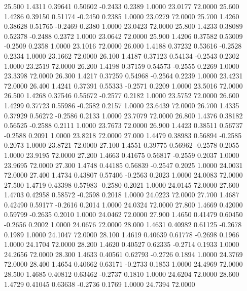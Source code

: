   25.500   1.4311   0.39641   0.50602  -0.2433   0.2389   1.0000  23.0177  72.0000
  25.600   1.4286   0.39150   0.51174  -0.2450   0.2385   1.0000  23.0279  72.0000
  25.700   1.4260   0.38628   0.51765  -0.2469   0.2380   1.0000  23.0423  72.0000
  25.800   1.4233   0.38089   0.52378  -0.2488   0.2372   1.0000  23.0642  72.0000
  25.900   1.4206   0.37582   0.53009  -0.2509   0.2358   1.0000  23.1016  72.0000
  26.000   1.4188   0.37232   0.53616  -0.2528   0.2334   1.0000  23.1662  72.0000
  26.100   1.4187   0.37123   0.54134  -0.2543   0.2302   1.0000  23.2519  72.0000
  26.200   1.4198   0.37159   0.54573  -0.2555   0.2269   1.0000  23.3398  72.0000
  26.300   1.4217   0.37259   0.54968  -0.2564   0.2239   1.0000  23.4231  72.0000
  26.400   1.4241   0.37391   0.55333  -0.2571   0.2209   1.0000  23.5016  72.0000
  26.500   1.4268   0.37546   0.55672  -0.2577   0.2182   1.0000  23.5752  72.0000
  26.600   1.4299   0.37723   0.55986  -0.2582   0.2157   1.0000  23.6439  72.0000
  26.700   1.4335   0.37929   0.56272  -0.2586   0.2133   1.0000  23.7079  72.0000
  26.800   1.4376   0.38182   0.56525  -0.2588   0.2111   1.0000  23.7673  72.0000
  26.900   1.4423   0.38511   0.56737  -0.2588   0.2091   1.0000  23.8218  72.0000
  27.000   1.4479   0.38983   0.56894  -0.2585   0.2073   1.0000  23.8721  72.0000
  27.100   1.4551   0.39775   0.56962  -0.2578   0.2055   1.0000  23.9195  72.0000
  27.200   1.4663   0.41675   0.56817  -0.2559   0.2037   1.0000  23.9695  72.0000
  27.300   1.4748   0.44185   0.56839  -0.2547   0.2025   1.0000  24.0031  72.0000
  27.400   1.4734   0.43807   0.57406  -0.2563   0.2023   1.0000  24.0083  72.0000
  27.500   1.4719   0.43398   0.57983  -0.2580   0.2021   1.0000  24.0145  72.0000
  27.600   1.4703   0.42958   0.58572  -0.2598   0.2018   1.0000  24.0223  72.0000
  27.700   1.4687   0.42490   0.59177  -0.2616   0.2014   1.0000  24.0324  72.0000
  27.800   1.4669   0.42000   0.59799  -0.2635   0.2010   1.0000  24.0462  72.0000
  27.900   1.4650   0.41479   0.60450  -0.2656   0.2002   1.0000  24.0676  72.0000
  28.000   1.4631   0.40982   0.61125  -0.2678   0.1989   1.0000  24.1047  72.0000
  28.100   1.4619   0.40639   0.61778  -0.2698   0.1966   1.0000  24.1704  72.0000
  28.200   1.4620   0.40527   0.62335  -0.2714   0.1933   1.0000  24.2656  72.0000
  28.300   1.4633   0.40561   0.62793  -0.2726   0.1894   1.0000  24.3769  72.0000
  28.400   1.4654   0.40662   0.63171  -0.2733   0.1853   1.0000  24.4969  72.0000
  28.500   1.4685   0.40812   0.63462  -0.2737   0.1810   1.0000  24.6204  72.0000
  28.600   1.4729   0.41045   0.63638  -0.2736   0.1769   1.0000  24.7394  72.0000

